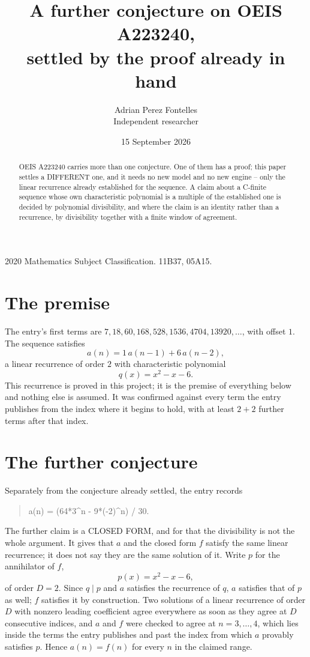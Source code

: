 \documentclass[11pt,a4paper]{article}
\title{A further conjecture on OEIS A223240,\\ \large settled by the proof already in hand}
\author{Adrian Perez Fontelles\\ \small Independent researcher}
\date{15 September 2026}
\theoremstyle{plain}
\theoremstyle{definition}
\begin{document}
\maketitle

\begin{abstract}
OEIS A223240 carries more than one conjecture. One of them has a proof; this paper settles a
DIFFERENT one, and it needs no new model and no new engine -- only the linear recurrence already
established for the sequence. A claim about a C-finite sequence whose own characteristic
polynomial is a multiple of the established one is decided by polynomial divisibility, and where
the claim is an identity rather than a recurrence, by divisibility together with a finite window
of agreement.
\end{abstract}

\noindent\small 2020 Mathematics Subject Classification. 11B37, 05A15.\normalsize

\section{The premise}

The entry's first terms are $7, 18, 60, 168, 528, 1536, 4704, 13920,\dots$, with offset $1$. The sequence satisfies
\[
  a(n)=1\,a(n-1) + 6\,a(n-2) ,
\]
a linear recurrence of order $2$ with characteristic polynomial
\[
  q(x)=x^{2} - x - 6 .
\]
This recurrence is proved in this project; it is the premise of everything below and nothing else is assumed.
It was confirmed against every term the entry publishes from the index where it begins to hold,
with at least $2+2$ further terms after that index.

\section{The further conjecture}

Separately from the conjecture already settled, the entry records

\begin{quote}\raggedright a(n) = (64*3\^{}n - 9*(-2)\^{}n) / 30.\end{quote}

The further claim is a CLOSED FORM, and for that the divisibility is not the whole argument. It
gives that $a$ and the closed form $f$ satisfy the same linear recurrence; it does not say they
are the same solution of it. Write $p$ for the annihilator of $f$,
\[
  p(x)=x^{2} - x - 6 ,
\]
of order $D=2$. Since $q\mid p$ and $a$ satisfies the recurrence of $q$, $a$ satisfies that of
$p$ as well; $f$ satisfies it by construction. Two solutions of a linear recurrence of order $D$
with nonzero leading coefficient agree everywhere as soon as they agree at $D$ consecutive
indices, and $a$ and $f$ were checked to agree at $n=3,\dots,4$,
which lies inside the terms the entry publishes and past the index from which $a$ provably
satisfies $p$. Hence $a(n)=f(n)$ for every $n$ in the claimed range.
\end{document}
